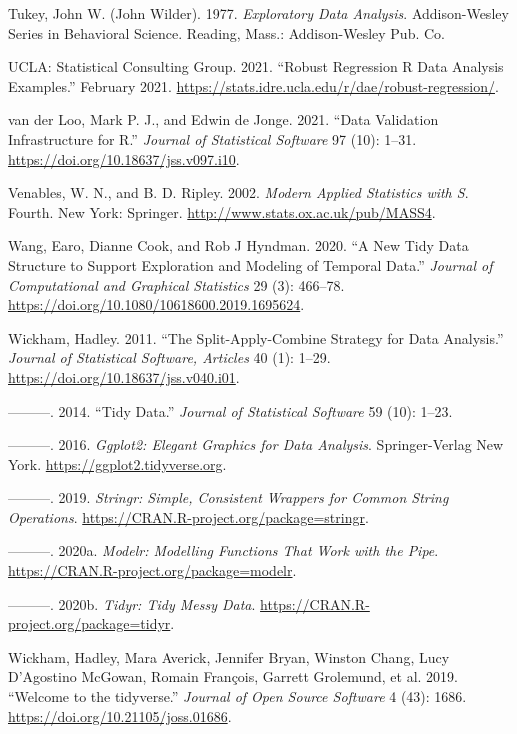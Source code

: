 \documentclass{article}
\begin{document}
\leavevmode\hypertarget{ref-tukey}{}%
Tukey, John W. (John Wilder). 1977. \emph{Exploratory Data Analysis}. Addison-Wesley Series in Behavioral Science. Reading, Mass.: Addison-Wesley Pub. Co.

\leavevmode\hypertarget{ref-rlm}{}%
UCLA: Statistical Consulting Group. 2021. ``Robust Regression \textbar{} R Data Analysis Examples.'' February 2021. \url{https://stats.idre.ucla.edu/r/dae/robust-regression/}.

\leavevmode\hypertarget{ref-validate}{}%
van der Loo, Mark P. J., and Edwin de Jonge. 2021. ``Data Validation Infrastructure for R.'' \emph{Journal of Statistical Software} 97 (10): 1--31. \url{https://doi.org/10.18637/jss.v097.i10}.

\leavevmode\hypertarget{ref-mass}{}%
Venables, W. N., and B. D. Ripley. 2002. \emph{Modern Applied Statistics with S}. Fourth. New York: Springer. \url{http://www.stats.ox.ac.uk/pub/MASS4}.

\leavevmode\hypertarget{ref-tsibble}{}%
Wang, Earo, Dianne Cook, and Rob J Hyndman. 2020. ``A New Tidy Data Structure to Support Exploration and Modeling of Temporal Data.'' \emph{Journal of Computational and Graphical Statistics} 29 (3): 466--78. \url{https://doi.org/10.1080/10618600.2019.1695624}.

\leavevmode\hypertarget{ref-plyr}{}%
Wickham, Hadley. 2011. ``The Split-Apply-Combine Strategy for Data Analysis.'' \emph{Journal of Statistical Software, Articles} 40 (1): 1--29. \url{https://doi.org/10.18637/jss.v040.i01}.

\leavevmode\hypertarget{ref-WickhamHadley2014TD}{}%
---------. 2014. ``Tidy Data.'' \emph{Journal of Statistical Software} 59 (10): 1--23.

\leavevmode\hypertarget{ref-ggplot2}{}%
---------. 2016. \emph{Ggplot2: Elegant Graphics for Data Analysis}. Springer-Verlag New York. \url{https://ggplot2.tidyverse.org}.

\leavevmode\hypertarget{ref-stringr}{}%
---------. 2019. \emph{Stringr: Simple, Consistent Wrappers for Common String Operations}. \url{https://CRAN.R-project.org/package=stringr}.

\leavevmode\hypertarget{ref-modelr}{}%
---------. 2020a. \emph{Modelr: Modelling Functions That Work with the Pipe}. \url{https://CRAN.R-project.org/package=modelr}.

\leavevmode\hypertarget{ref-tidyr}{}%
---------. 2020b. \emph{Tidyr: Tidy Messy Data}. \url{https://CRAN.R-project.org/package=tidyr}.

\leavevmode\hypertarget{ref-tidyverse}{}%
Wickham, Hadley, Mara Averick, Jennifer Bryan, Winston Chang, Lucy D'Agostino McGowan, Romain François, Garrett Grolemund, et al. 2019. ``Welcome to the tidyverse.'' \emph{Journal of Open Source Software} 4 (43): 1686. \url{https://doi.org/10.21105/joss.01686}.
\end{document}
